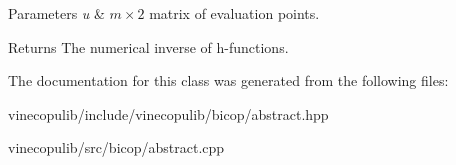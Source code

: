 \begin{DoxyParams}{Parameters}
{\em u} & $m \times 2$ matrix of evaluation points. \\
\hline
\end{DoxyParams}
\begin{DoxyReturn}{Returns}
The numerical inverse of h-\/functions. 
\end{DoxyReturn}


The documentation for this class was generated from the following files\+:\begin{DoxyCompactItemize}
\item 
vinecopulib/include/vinecopulib/bicop/abstract.\+hpp\item 
vinecopulib/src/bicop/abstract.\+cpp\end{DoxyCompactItemize}
